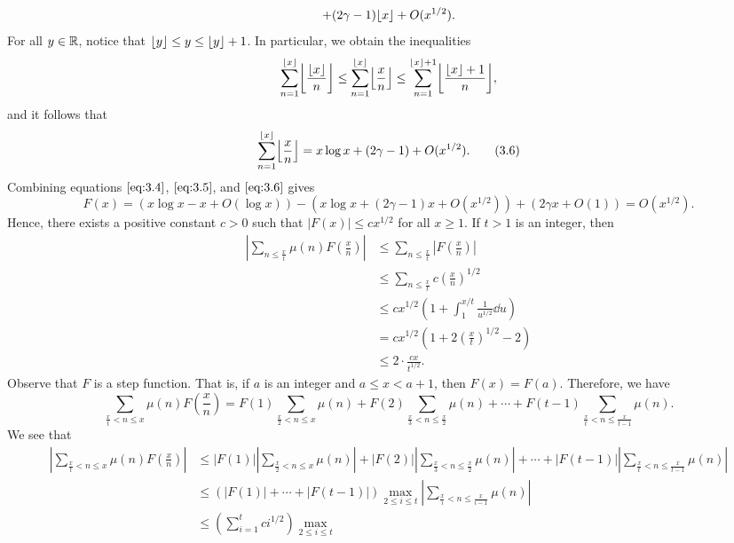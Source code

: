\begin{pf}
\[    + (2\gamma - 1)\lfloor x\rfloor + O(x^{1/2}). \] 
    For all $y \in \mathbb{R}$, notice that $\lfloor y\rfloor \leq y \leq \lfloor y\rfloor+1$. In particular, 
    we obtain the inequalities 
    \[ \sum_{n=1}^{\floor{x}} \floor*{\frac{\floor{x}}n} \leq 
    \sum_{n=1}^{\floor{x}} \floor*{\frac{x}n} \leq 
    \sum_{n=1}^{\floor{x}+1} \floor*{\frac{\floor{x}+1}n}, \] 
    and it follows that 
    \[ \sum_{n=1}^{\floor{x}} \floor*{\frac{x}{n}} = x\log x + (2\gamma - 1) 
    + O(x^{1/2}). \tag{3.6}\label{eq:3.6} \] 
    Combining equations $\eqref{eq:3.4}$, $\eqref{eq:3.5}$, and $\eqref{eq:3.6}$ gives 
    \[ F(x) = (x\log x - x + O(\log x)) - (x\log x + (2\gamma-1)x + O(x^{1/2})) 
    + (2\gamma x + O(1)) = O(x^{1/2}). \] 
    Hence, there exists a positive constant $c > 0$ such that $|F(x)| \leq cx^{1/2}$
    for all $x \geq 1$. If $t > 1$ is an integer, then 
    \begin{align*}
        \left| \sum_{n\leq \frac xt} \mu(n) F\left( \frac xn \right) \right| 
        &\leq \sum_{n\leq \frac xt} \left| F\left( \frac xn \right) \right| \\ 
        &\leq \sum_{n\leq \frac xt} c\left( \frac xn \right)^{\!1/2} \\
        &\leq cx^{1/2} \left( 1 + \int_1^{x/t} \frac{1}{u^{1/2}}\dd u \right) \\
        &= cx^{1/2} \left(1 + 2 \left( \frac xt \right)^{\!1/2} - 2 \right) \\ 
        &\leq 2 \cdot \frac{cx}{t^{1/2}}. \tag{3.7}\label{eq:3.7}
    \end{align*}
    Observe that $F$ is a step function. That is, if $a$ is an integer and 
    $a \leq x < a + 1$, then $F(x) = F(a)$. Therefore, we have 
    \[ \sum_{\frac xt < n \leq x} \mu(n) F\left(\frac xn \right) 
    = F(1) \sum_{\frac x2 < n \leq x} \mu(n) + F(2) \sum_{\frac x3 < n \leq 
    \frac x2} \mu(n) + \cdots + F(t-1) \sum_{\frac xt < n \leq \frac{x}{t-1}} \mu(n). \] 
    We see that 
    \begin{align*}
        \left| \sum_{\frac xt < n \leq x} \mu(n) F\left(\frac xn \right) \right| 
        &\leq |F(1)| \left| \sum_{\frac x2 < n \leq x} \mu(n) \right| + 
        |F(2)| \left| \sum_{\frac x3 < n \leq \frac x2} \mu(n) \right| + \cdots + 
        |F(t-1)| \left| \sum_{\frac xt < n \leq \frac{x}{t-1}} \mu(n) \right| \\ 
        &\leq (|F(1)| + \cdots + |F(t-1)|) \max_{2\leq i \leq t} 
        \left| \sum_{\frac xi < n \leq \frac{x}{i-1}} \mu(n) \right| \\ 
        &\leq \left( \sum_{i=1}^t ci^{1/2} \right) \max_{2\leq i \leq t} 

\end{align*}
\end{pf}

